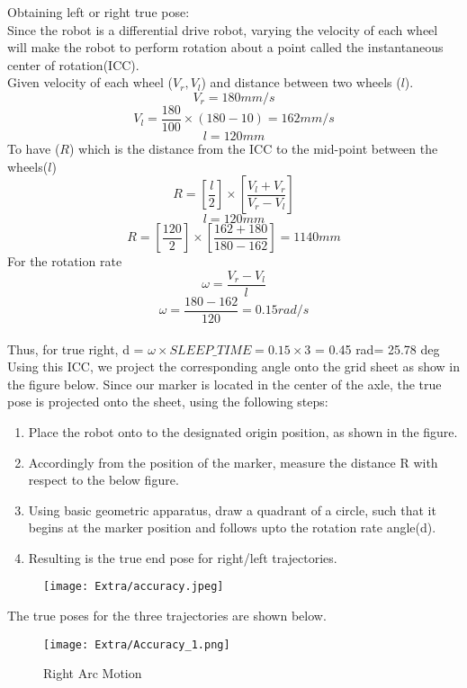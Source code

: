 	Obtaining left or right true pose:\\
	Since the robot is a differential drive robot, varying the velocity of each wheel will make the robot to perform rotation about a point called the instantaneous center of rotation(ICC).\\
	Given velocity of each wheel ($V_r,V_l$) and distance between two wheels ($l$). 
	$$V_r =180mm/s$$
	$$V_l= \frac{180}{100}\times(180-10)=162mm/s$$
	$$l=120mm$$
	To have ($R$) which is the distance from the ICC to the mid-point between the wheels($l$)\\
	$$R=[\frac{l}{2}]\times[\frac{V_l+V_r}{V_r-V_l}]$$
	$$l=120mm$$
	$$ R= [\frac{120}{2}]\times[\frac{162+180}{180-162}] = 1140mm$$
	For the rotation rate \
	$$\omega =\frac{V_r-V_l}{l}$$
	$$\omega= \frac{180-162}{120}=0.15rad/s$$
	\\
	Thus, for true right, d = $\omega \times SLEEP\_TIME = 0.15 \times 3 $ = 0.45 rad= 25.78 deg \\
	Using this ICC, we project the corresponding angle onto the grid sheet as show in the figure below. Since our marker is located in the center of the axle, the true pose is projected onto the sheet, using the following steps:
	
	\begin{enumerate}
		\item
		Place the robot onto to the designated origin position, as shown in the figure.
		\item
		Accordingly from the position of the marker, measure the distance R with respect to the below figure.
		\item
		Using basic geometric apparatus, draw a quadrant of a circle, such that it begins at the marker position and follows upto the rotation rate angle(d).
		\item
		Resulting is the true end pose for right/left trajectories.
	\end{enumerate}
	
	\begin{figure}[H]
		\centering
		\texttt{[image: Extra/accuracy.jpeg]}	
	\end{figure}
	
	\newpage
	The true poses for the three trajectories are shown below.
	
	\begin{figure}[H]
		\centering
		\texttt{[image: Extra/Accuracy\_1.png]}
		\caption{Right Arc Motion}
	\end{figure}
	
